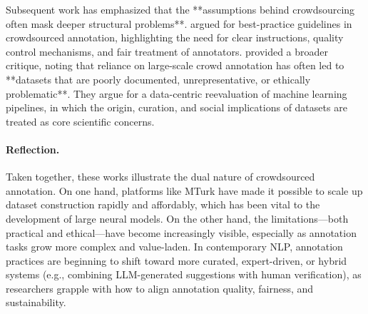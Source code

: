 Subsequent work has emphasized that the **assumptions behind crowdsourcing often mask deeper structural problems**. \citet{sabou2014corpus} argued for best-practice guidelines in crowdsourced annotation, highlighting the need for clear instructions, quality control mechanisms, and fair treatment of annotators. \citet{paullada2021data} provided a broader critique, noting that reliance on large-scale crowd annotation has often led to **datasets that are poorly documented, unrepresentative, or ethically problematic**. They argue for a data-centric reevaluation of machine learning pipelines, in which the origin, curation, and social implications of datasets are treated as core scientific concerns.

\paragraph{Reflection.} Taken together, these works illustrate the dual nature of crowdsourced annotation. On one hand, platforms like MTurk have made it possible to scale up dataset construction rapidly and affordably, which has been vital to the development of large neural models. On the other hand, the limitations—both practical and ethical—have become increasingly visible, especially as annotation tasks grow more complex and value-laden. In contemporary NLP, annotation practices are beginning to shift toward more curated, expert-driven, or hybrid systems (e.g., combining LLM-generated suggestions with human verification), as researchers grapple with how to align annotation quality, fairness, and sustainability.
